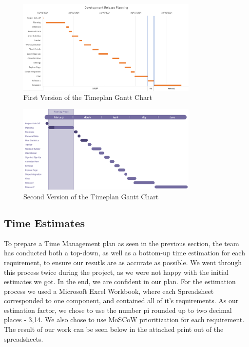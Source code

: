 \begin{figure}[H]
    \centering
    \includegraphics[width=0.8\textwidth]{images/initial_gantt_chart.png}
    \caption{First Version of the Timeplan Gantt Chart}
    \label{fig:initialganttchart}
\end{figure}

\begin{figure}[H]
    \centering
    \includegraphics[width=0.8\textwidth]{images/gantt_chart.png}
    \caption{Second Version of the Timeplan Gantt Chart}
    \label{fig:ganttchart}
\end{figure}

\subsection{Time Estimates}
To prepare a Time Management plan as seen in the previous section, the team has conducted both a top-down, as well as a bottom-up 
time estimation for each requirement, to ensure our resutls are as accurate as possible. We went through this process twice during the
project, as we were not happy with the initial estimates we got. In the end, we are confident in our plan.
For the estimation process we used a Microsoft Excel Workbook, where each Spreadsheet corresponded to one component, and contained
all of it's requirements. As our estimation factor, we chose to use the number pi rounded up to two decimal places - 3,14. We also chose to
use MoSCoW prioritization for each requirement. The result of our work can be seen below in the attached print out of the spreadsheets.

